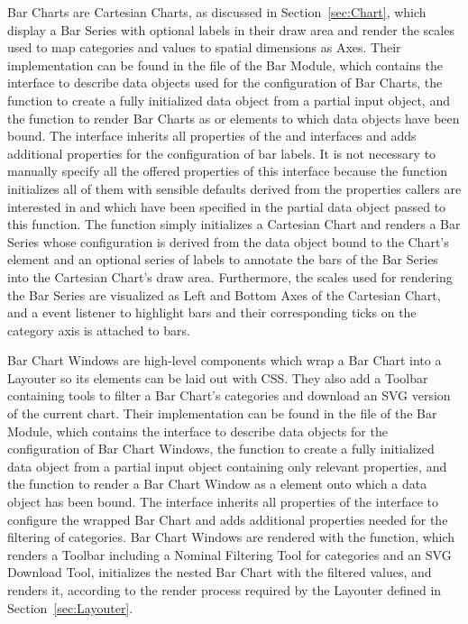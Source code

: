 Bar Charts are Cartesian Charts, as discussed in
Section~\ref{sec:Chart}, which display a Bar Series with optional
labels in their draw area and render the scales used to map categories
and values to spatial dimensions as Axes. Their implementation can be
found in the  file of the Bar Module, which
contains the  interface to describe data objects used
for the configuration of Bar Charts, the  function
to create a fully initialized  data object from a
partial input object, and the  function to render
Bar Charts as  or  elements to which
 data objects have been bound. The 
interface inherits all properties of the  and
 interfaces and adds additional properties for the
configuration of bar labels. It is not necessary to manually specify
all the offered properties of this interface because the
 function initializes all of them with sensible
defaults derived from the properties callers are interested in and
which have been specified in the partial data object passed to this
function. The  function simply initializes a
Cartesian Chart and renders a Bar Series whose configuration is
derived from the  data object bound to the Chart's
element and an optional series of labels to annotate the bars of the
Bar Series into the Cartesian Chart's draw area. Furthermore, the
scales used for rendering the Bar Series are visualized as Left and
Bottom Axes of the Cartesian Chart, and a  event
listener to highlight bars and their corresponding ticks on the
category axis is attached to bars.

Bar Chart Windows are high-level components which wrap a Bar Chart
into a Layouter so its elements can be laid out with CSS. They also
add a Toolbar containing tools to filter a Bar Chart's categories and
download an SVG version of the current chart. Their implementation can
be found in the  file of the Bar Module,
which contains the  interface to describe data
objects for the configuration of Bar Chart Windows, the
 function to create a fully initialized
 data object from a partial input object
containing only relevant properties, and the
 function to render a Bar Chart Window as a
 element onto which a  data object
has been bound. The  interface inherits all
properties of the  interface to configure the wrapped
Bar Chart and adds additional properties needed for the filtering of
categories. Bar Chart Windows are rendered with the
 function, which renders a Toolbar
including a Nominal Filtering Tool for categories and an SVG Download
Tool, initializes the nested Bar Chart with the filtered values, and
renders it, according to the render process required by the Layouter
defined in Section~\ref{sec:Layouter}.


